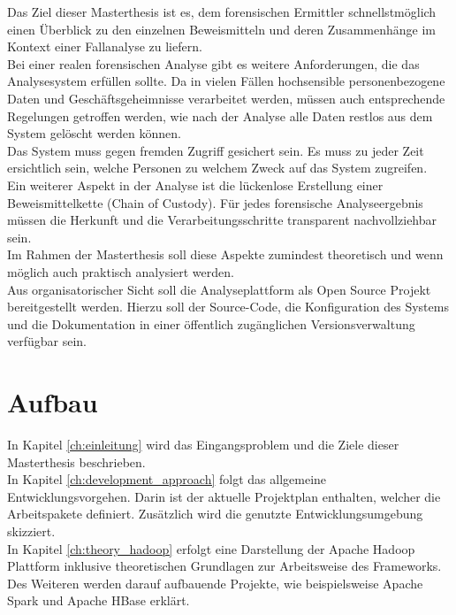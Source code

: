 \noindent
Das Ziel dieser Masterthesis ist es, dem forensischen Ermittler schnellstmöglich einen Überblick zu den einzelnen Beweismitteln und deren Zusammenhänge im Kontext einer Fallanalyse zu liefern. \\

\noindent
Bei einer realen forensischen Analyse gibt es weitere Anforderungen, die das Analysesystem erfüllen sollte. Da in vielen Fällen hochsensible personenbezogene Daten und Geschäftsgeheimnisse verarbeitet werden, müssen auch entsprechende Regelungen getroffen werden, wie nach der Analyse alle Daten restlos aus dem System gelöscht werden können.\\
Das System muss gegen fremden Zugriff gesichert sein. Es muss zu jeder Zeit ersichtlich sein, welche Personen zu welchem Zweck auf das System zugreifen.\\
Ein weiterer Aspekt in der Analyse ist die lückenlose Erstellung einer Beweismittelkette (Chain of Custody). Für jedes forensische Analyseergebnis müssen die Herkunft und die Verarbeitungsschritte transparent nachvollziehbar sein.\\
Im Rahmen der Masterthesis soll diese Aspekte zumindest theoretisch und wenn möglich auch praktisch analysiert werden.\\

\noindent
Aus organisatorischer Sicht soll die Analyseplattform als Open Source Projekt bereitgestellt werden. Hierzu soll der Source-Code, die Konfiguration des Systems und die Dokumentation in einer öffentlich zugänglichen Versionsverwaltung verfügbar sein.\\


\clearpage
\section{Aufbau}
In Kapitel \ref{ch:einleitung} wird das Eingangsproblem und die Ziele dieser Masterthesis beschrieben.\\ 
In Kapitel \ref{ch:development_approach} folgt das allgemeine Entwicklungsvorgehen. Darin ist der aktuelle Projektplan enthalten, welcher die Arbeitspakete definiert.
Zusätzlich wird die genutzte Entwicklungsumgebung skizziert.\\

\noindent
In Kapitel \ref{ch:theory_hadoop} erfolgt eine Darstellung der Apache Hadoop Plattform inklusive theoretischen Grundlagen zur Arbeitsweise des Frameworks. Des Weiteren werden darauf aufbauende Projekte, wie beispielsweise Apache Spark und Apache HBase erklärt.\\

